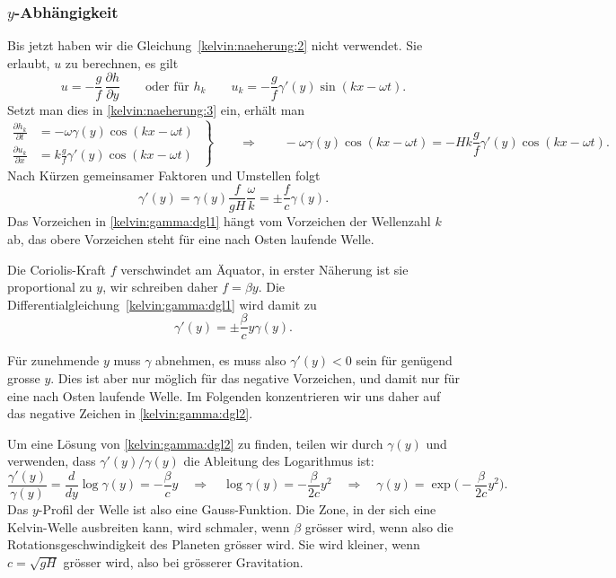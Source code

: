 \subsubsection{$y$-Abhängigkeit}
Bis jetzt haben wir die Gleichung~\eqref{kelvin:naeherung:2} nicht
verwendet.
Sie erlaubt, $u$ zu berechnen, es gilt
\[
u=-\frac{g}{f}\,\frac{\partial h}{\partial y}
\qquad
\text{oder für $h_k$}
\qquad
u_k=-\frac{g}{f} \gamma'(y) \sin(kx-\omega t).
\]
Setzt man dies in \eqref{kelvin:naeherung:3} ein, erhält man
\begin{equation}
\left.
\begin{aligned}
\frac{\partial h_k}{\partial t}
&=
-\omega
\gamma(y) \cos(kx-\omega t)
\\
\frac{\partial u_k}{\partial x}
&=
k \frac{g}{f}\gamma'(y) \cos(kx-\omega t)
\end{aligned}
\;\right\}
\qquad\Rightarrow\qquad
-\omega
\gamma(y) \cos(kx-\omega t)
=
-H
k \frac{g}{f}\gamma'(y) \cos(kx-\omega t).
\end{equation}
Nach Kürzen gemeinsamer Faktoren und Umstellen folgt
\begin{equation}
\gamma'(y)
=
\gamma(y) \frac{f}{gH}\frac{\omega}{k}
=
\pm
\frac{f}{c} \gamma(y).
\label{kelvin:gamma:dgl1}
\end{equation}
Das Vorzeichen in \eqref{kelvin:gamma:dgl1} hängt vom Vorzeichen der
Wellenzahl $k$ ab, das obere Vorzeichen steht für eine nach Osten
laufende Welle.

Die Coriolis-Kraft $f$ verschwindet am Äquator, in erster Näherung
ist sie proportional zu $y$, wir schreiben daher $f=\beta y$.
Die Differentialgleichung~\eqref{kelvin:gamma:dgl1} wird damit zu
\begin{equation}
\gamma'(y)
=
\pm
\frac{\beta}{c} 
y\gamma(y).
\label{kelvin:gamma:dgl2}
\end{equation}

Für zunehmende $y$ muss $\gamma$ abnehmen, es muss also $\gamma'(y)<0$ sein
für genügend grosse $y$.
Dies ist aber nur möglich für das negative Vorzeichen, und damit nur
für eine nach Osten laufende Welle.
Im Folgenden konzentrieren wir uns daher auf das negative Zeichen
in \eqref{kelvin:gamma:dgl2}.

Um eine Lösung von \eqref{kelvin:gamma:dgl2} zu finden, teilen wir
durch $\gamma(y)$
und verwenden, dass $\gamma'(y)/\gamma(y)$ die Ableitung des
Logarithmus ist:
\begin{equation}
\frac{\gamma'(y)}{\gamma(y)}
=
\frac{d}{dy}\log \gamma(y) = -\frac{\beta}{c} y
\quad\Rightarrow\quad
\log\gamma(y) = -\frac{\beta}{2c}y^2
\quad\Rightarrow\quad
\gamma(y) = \exp\biggl(
- \frac{\beta}{2c}y^2
\biggr).
\end{equation}
Das $y$-Profil der Welle ist also eine Gauss-Funktion.
Die Zone, in der sich eine Kelvin-Welle ausbreiten kann, 
wird schmaler, wenn $\beta$ grösser wird, wenn also die 
Rotationsgeschwindigkeit des Planeten grösser wird.
Sie wird kleiner, wenn $c=\sqrt{gH}$ grösser wird, also
bei grösserer Gravitation.

